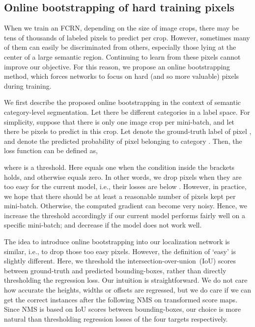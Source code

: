 \documentclass{article}
\begin{document}
\subsection{Online bootstrapping of hard training pixels}


When we train an FCRN, depending on the size of image crops, there may be tens of thousands of labeled pixels to predict per crop.
However, sometimes many of them can easily be discriminated from others,
especially those lying at the center of a large semantic region.
Continuing to learn from these pixels cannot improve our objective.
For this reason,
we propose an online bootstrapping method, which forces networks to
focus on hard (and so more valuable) pixels during training.



We first describe the proposed online bootstrapping in the context of semantic  category-level segmentation.
Let there be  different categories  in a label space.
For simplicity, suppose that there is only one image crop per mini-batch, and let there be  pixels  to predict in this crop.
Let  denote the ground-truth label of pixel , and  denote the predicted probability of pixel  belonging to category .
Then, the loss function can be defined as,

where  is a threshold. Here
 equals one when the condition inside the brackets holds, and otherwise equals zero.
In other words, we drop pixels when they are too easy for the current model, i.e., their losses are below .
However, in practice, we hope that there should be at least a reasonable number of pixels kept per mini-batch.
Otherwise, the computed gradient can become very noisy.
Hence, we  increase the threshold  accordingly if our current model performs fairly well on a specific mini-batch;
and decrease if the model does not work well.




The idea to introduce online bootstrapping into our localization network is similar, i.e., to drop those too easy pixels.
However, the definition of `easy' is slightly different.
Here, we threshold the intersection-over-union~(IoU) scores between ground-truth and predicted bounding-boxes, rather than directly thresholding the regression loss.
Our intuition is straightforward.
We do not care how accurate the heights, widths or offsets are regressed, but we do care if we can get the correct instances after the following NMS on transformed score maps.
Since NMS is based on IoU scores between bounding-boxes, our choice is more natural than thresholding regression losses of the four targets respectively.
\end{document}
